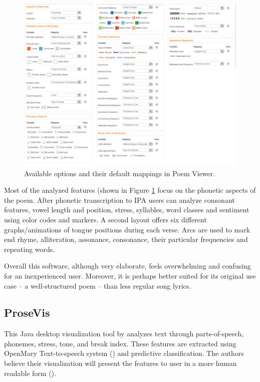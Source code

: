 \begin{figure}[h]\centering
	\includegraphics[scale=0.4]{../img/snapshotPV_options.pdf}
	\caption{Available options and their default mappings in Poem Viewer.}\label{screenshotPV-options}
\end{figure}

Most of the analyzed features (shown in Figure \ref{screenshotPV-options} focus on the phonetic aspects of the poem. After phonetic transcription to IPA users can analyze consonant features, vowel length and position, stress, syllables, word classes and sentiment using color codes and markers. A second layout offers six different graphs/animations of tongue positions during each verse. Arcs are used to mark end rhyme, alliteration, assonance, consonance, their particular frequencies and repeating words.


Overall this software, although very elaborate, feels overwhelming and confusing for an inexperienced user. Moreover, it is perhaps better suited for its original use case -- a well-structured poem -- than less regular song lyrics.


\subsection*{ProseVis}
This Java desktop visualization tool by \cite{Clement2013} analyzes text through
parts-of-speech, phonemes, stress, tone, and break index. These features are extracted using OpenMary Text-to-speech system (\cite{Schroder2006}) and predictive classification. The authors believe their visualization will present the features to user in a more human readable form (\cite{prosevis2017sourceforge}).

